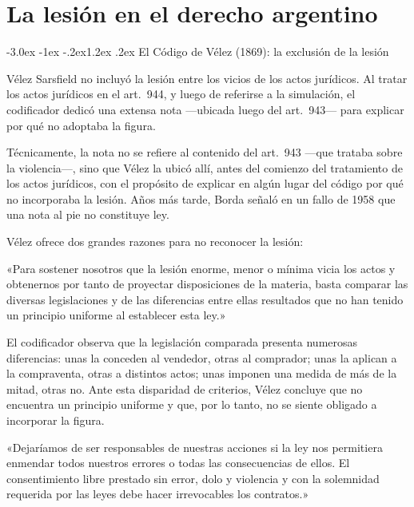 \documentclass[12pt,oneside]{book}
\makeatletter
\renewcommand\section{\@startsection{section}{1}{\z@}%
  {-3.0ex \@plus -1ex \@minus -.2ex}{1.2ex \@plus .2ex}%
  {\normalfont\large\bfseries\color{acento}}}
\makeatother
\begin{document}

\chapter{La lesión en el derecho argentino}

\section{El Código de Vélez (1869): la exclusión de la lesión}

Vélez Sarsfield no incluyó la lesión entre los vicios de los actos jurídicos. Al tratar los actos jurídicos en el art.\ 944, y luego de referirse a la simulación, el codificador dedicó una extensa nota ---ubicada luego del art.\ 943--- para explicar por qué no adoptaba la figura.

\begin{nota}
Técnicamente, la nota no se refiere al contenido del art.\ 943 ---que trataba sobre la violencia---, sino que Vélez la ubicó allí, antes del comienzo del tratamiento de los actos jurídicos, con el propósito de explicar en algún lugar del código por qué no incorporaba la lesión. Años más tarde, Borda señaló en un fallo de 1958 que una nota al pie no constituye ley.
\end{nota}

Vélez ofrece dos grandes razones para no reconocer la lesión:

\begin{regla}
«Para sostener nosotros que la lesión enorme, menor o mínima vicia los actos y obtenernos por tanto de proyectar disposiciones de la materia, basta comparar las diversas legislaciones y de las diferencias entre ellas resultados que no han tenido un principio uniforme al establecer esta ley.»
\end{regla}

El codificador observa que la legislación comparada presenta numerosas diferencias: unas la conceden al vendedor, otras al comprador; unas la aplican a la compraventa, otras a distintos actos; unas imponen una medida de más de la mitad, otras no. Ante esta disparidad de criterios, Vélez concluye que no encuentra un principio uniforme y que, por lo tanto, no se siente obligado a incorporar la figura.

\begin{regla}
«Dejaríamos de ser responsables de nuestras acciones si la ley nos permitiera enmendar todos nuestros errores o todas las consecuencias de ellos. El consentimiento libre prestado sin error, dolo y violencia y con la solemnidad requerida por las leyes debe hacer irrevocables los contratos.»
\end{regla}
\end{document}
